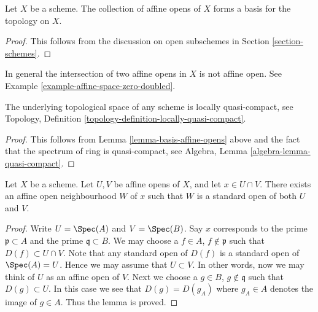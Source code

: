 \begin{lemma}
\label{lemma-basis-affine-opens}
Let $X$ be a scheme. The collection of affine opens
of $X$ forms a basis for the topology on $X$.
\end{lemma}

\begin{proof}
This follows from the discussion on open subschemes
in Section \ref{section-schemes}.
\end{proof}

\begin{remark}
\label{remark-intersection-affine-opens}
In general the intersection of two affine opens in $X$
is not affine open. See Example \ref{example-affine-space-zero-doubled}.
\end{remark}

\begin{lemma}
\label{lemma-locally-quasi-compact}
The underlying topological space of any scheme is
locally quasi-compact, see
Topology, Definition \ref{topology-definition-locally-quasi-compact}.
\end{lemma}

\begin{proof}
This follows from Lemma \ref{lemma-basis-affine-opens} above
and the fact that the spectrum of ring is quasi-compact, see
Algebra, Lemma \ref{algebra-lemma-quasi-compact}.
\end{proof}

\begin{lemma}
\label{lemma-standard-open-two-affines}
Let $X$ be a scheme.
Let $U, V$ be affine opens of $X$, and let $x \in U \cap V$.
There exists an affine open neighbourhood $W$ of $x$
such that $W$ is a standard open of both $U$ and $V$.
\end{lemma}

\begin{proof}
Write $U = \Spec(A)$ and $V = \Spec(B)$.
Say $x$ corresponds to the prime $\mathfrak p \subset A$
and the prime $\mathfrak q \subset B$.
We may choose a $f \in A$, $f \not \in \mathfrak p$ such that
$D(f) \subset U \cap V$. Note that any standard open of $D(f)$
is a standard open of $\Spec(A) = U$. Hence we may assume
that $U \subset V$. In other words, now we may think of $U$
as an affine open of $V$. Next we choose a
$g \in B$, $g \not \in \mathfrak q$ such that
$D(g) \subset U$. In this case we see that $D(g) = D(g_A)$
where $g_A \in A$ denotes the image of $g \in A$. Thus the lemma
is proved.
\end{proof}

